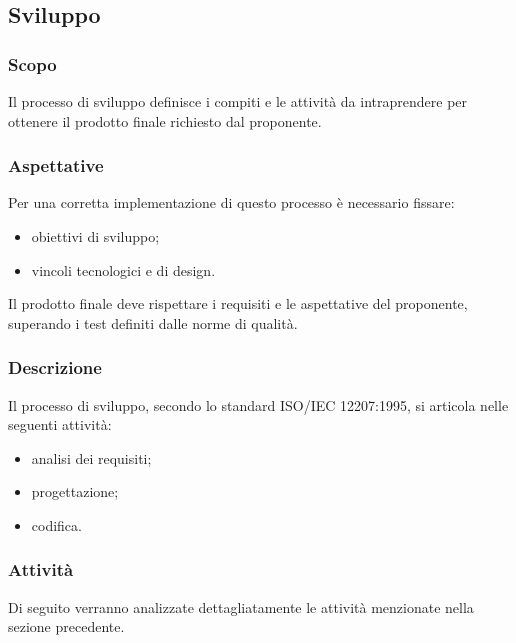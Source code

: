 \subsection{Sviluppo}
		\subsubsection{Scopo}
			Il processo di sviluppo definisce i compiti e le attività da intraprendere per ottenere il prodotto finale richiesto dal proponente.
		\subsubsection{Aspettative}
			Per una corretta implementazione di questo processo è necessario fissare:
				\begin{itemize}
					\item obiettivi di sviluppo;
					\item vincoli tecnologici e di design.
				\end{itemize}	
			Il prodotto finale deve rispettare i requisiti e le aspettative del proponente, superando i test definiti dalle norme di qualità.
		\subsubsection{Descrizione}
			Il processo di sviluppo, secondo lo standard ISO/IEC 12207:1995, si articola nelle seguenti attività:
				\begin{itemize}
					\item analisi dei requisiti;
					\item progettazione;
					\item codifica.
				\end{itemize}
			
		\subsubsection{Attività}
			Di seguito verranno analizzate dettagliatamente le attività menzionate nella sezione precedente.
